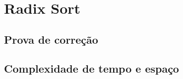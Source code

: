 \section{Radix Sort}
\lipsum[21]




\subsection{Prova de correção}
\lipsum[19]

\subsection{Complexidade de tempo e espaço}
\lipsum[19]
